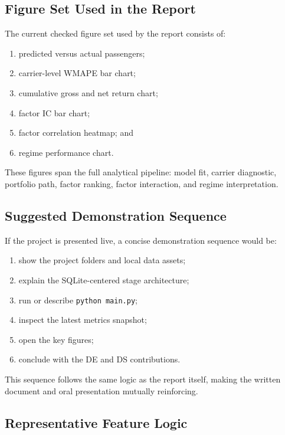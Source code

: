 \documentclass[11pt,a4paper]{article}
\begin{document}
\subsection{Figure Set Used in the Report}

The current checked figure set used by the report consists of:

\begin{enumerate}[leftmargin=*, label=(\arabic*)]
  \item predicted versus actual passengers;
  \item carrier-level WMAPE bar chart;
  \item cumulative gross and net return chart;
  \item factor IC bar chart;
  \item factor correlation heatmap; and
  \item regime performance chart.
\end{enumerate}

These figures span the full analytical pipeline: model fit, carrier diagnostic,
portfolio path, factor ranking, factor interaction, and regime interpretation.

\subsection{Suggested Demonstration Sequence}

If the project is presented live, a concise demonstration sequence would be:

\begin{enumerate}[leftmargin=*, label=(\arabic*)]
  \item show the project folders and local data assets;
  \item explain the SQLite-centered stage architecture;
  \item run or describe \texttt{python main.py};
  \item inspect the latest metrics snapshot;
  \item open the key figures;
  \item conclude with the DE and DS contributions.
\end{enumerate}

This sequence follows the same logic as the report itself, making the written
document and oral presentation mutually reinforcing.

\subsection{Representative Feature Logic}
\end{document}
